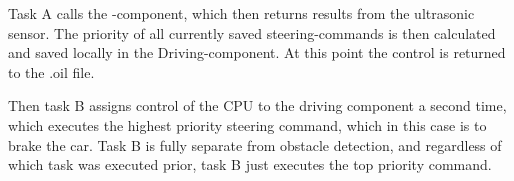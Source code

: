 Task A calls the -component, which then returns results from the ultrasonic sensor. The priority of all currently saved steering-commands is then calculated and saved locally in the Driving-component. At this point the control is returned to the .oil file. 

Then task B assigns control of the CPU to the driving component a second time, which executes the highest priority steering command, which in this case is to brake the car. Task B is fully separate from obstacle detection, and regardless of which task was executed prior, task B just executes the top priority command. 









